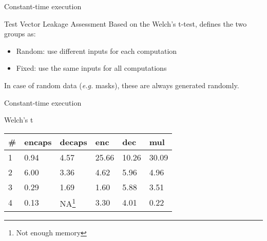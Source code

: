 \begin{frame}{Constant-time execution}
    \begin{block}{Test Vector Leakage Assessment}
        Based on the Welch's t-test, defines the two groups as:
        \begin{itemize}
            \item Random: use different inputs for each computation
            \item Fixed: use the same inputs for all computations
        \end{itemize}
        In case of random data (\textit{e.g.} masks), these are always generated randomly.
    \end{block}
\end{frame}

\begin{frame}{Constant-time execution}
    \begin{block}{Welch's t}
        \begin{table}
            \begin{tabular}{llllll}
                \# & encaps & decaps & enc & dec & mul \\ \hline
                1 & 0.94 & 4.57 & 25.66 & 10.26 & 30.09 \\
                2 & 6.00 & 3.36 & 4.62 & 5.96 & 4.96 \\
                3 & 0.29 & 1.69 & 1.60 & 5.88 & 3.51 \\
                4 & 0.13 & NA\footnote{Not enough memory} & 3.30 & 4.01 & 0.22
            \end{tabular}
        \end{table}        
    \end{block}
\end{frame}
